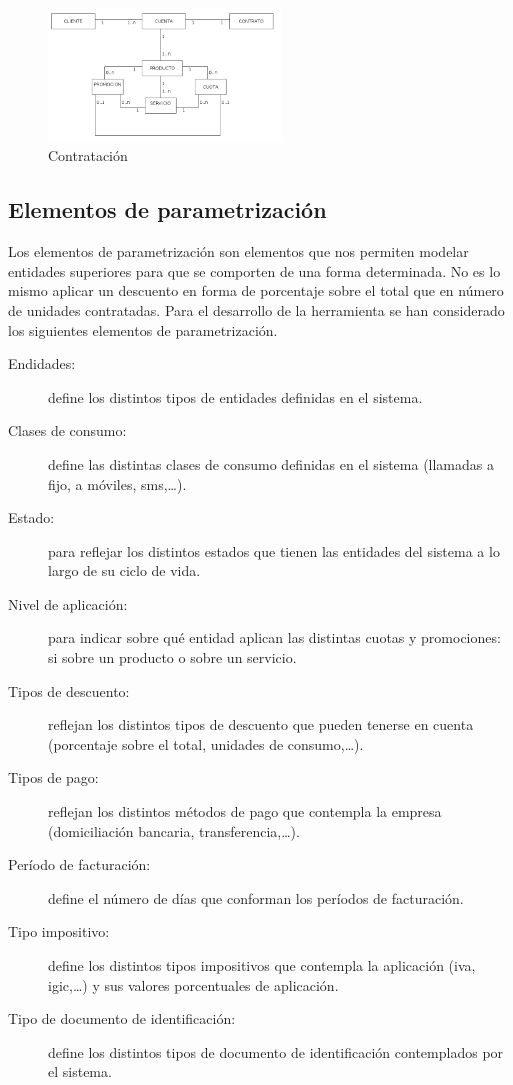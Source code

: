 \begin{figure}
  \centering
  \includegraphics[width=0.55\textwidth]{imaxes/instancia.png}
  \caption{Contratación}
  \label{fig:contratacion}
\end{figure}


\subsection{Elementos de parametrización}
\label{sub:parametrizacion}
Los elementos de parametrización son elementos que nos permiten modelar entidades superiores para que se comporten de una forma determinada. No es lo mismo aplicar un descuento en forma de porcentaje sobre el total que en número de unidades contratadas. Para el desarrollo de la herramienta se han considerado los siguientes elementos de parametrización.
\begin{description}
\item[Endidades:] define los distintos tipos de entidades definidas en el sistema.
\item[Clases de consumo:] define las distintas clases de consumo definidas en el sistema (llamadas a fijo, a móviles, sms,\dots).
\item[Estado:] para reflejar los distintos estados que tienen las entidades del sistema a lo largo de su ciclo de vida.
\item[Nivel de aplicación:] para indicar sobre qué entidad aplican las distintas cuotas y promociones: si sobre un producto o sobre un servicio.
\item[Tipos de descuento:] reflejan los distintos tipos de descuento que pueden tenerse en cuenta (porcentaje sobre el total, unidades de consumo,\dots).
\item[Tipos de pago:] reflejan los distintos métodos de pago que contempla la empresa (domiciliación bancaria, transferencia,\dots).
\item[Período de facturación:] define el número de días que conforman los  períodos de facturación.
\item[Tipo impositivo:] define los distintos tipos impositivos que contempla la aplicación (iva, igic,\dots) y sus valores porcentuales de aplicación.
\item[Tipo de documento de identificación:] define los distintos tipos de documento de identificación contemplados por el sistema.
\end{description}




